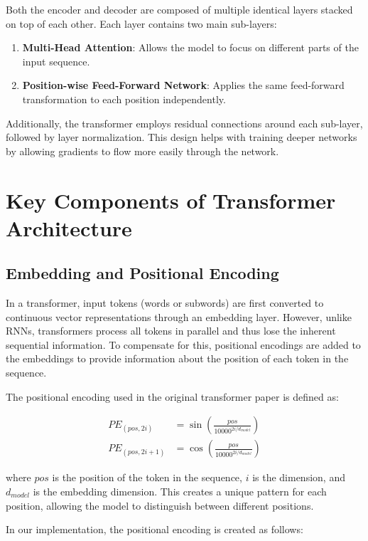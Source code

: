 \documentclass{article}
\begin{document}
Both the encoder and decoder are composed of multiple identical layers stacked on top of each other. Each layer contains two main sub-layers:

\begin{enumerate}
    \item \textbf{Multi-Head Attention}: Allows the model to focus on different parts of the input sequence.
    \item \textbf{Position-wise Feed-Forward Network}: Applies the same feed-forward transformation to each position independently.
\end{enumerate}

Additionally, the transformer employs residual connections around each sub-layer, followed by layer normalization. This design helps with training deeper networks by allowing gradients to flow more easily through the network.

\section{Key Components of Transformer Architecture}

\subsection{Embedding and Positional Encoding}

In a transformer, input tokens (words or subwords) are first converted to continuous vector representations through an embedding layer. However, unlike RNNs, transformers process all tokens in parallel and thus lose the inherent sequential information. To compensate for this, positional encodings are added to the embeddings to provide information about the position of each token in the sequence.

The positional encoding used in the original transformer paper is defined as:

\begin{align}
PE_{(pos, 2i)} &= \sin\left(\frac{pos}{10000^{2i/d_{model}}}\right) \\
PE_{(pos, 2i+1)} &= \cos\left(\frac{pos}{10000^{2i/d_{model}}}\right)
\end{align}

where $pos$ is the position of the token in the sequence, $i$ is the dimension, and $d_{model}$ is the embedding dimension. This creates a unique pattern for each position, allowing the model to distinguish between different positions.

In our implementation, the positional encoding is created as follows:
\end{document}
